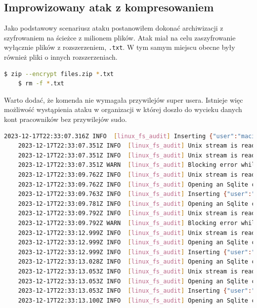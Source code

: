 \subsection{Improwizowany atak z kompresowaniem}
Jako podstawowy scenariusz ataku postanowiłem dokonać archiwizacji z szyfrowaniem na ścieżce z milionem plików. Atak miał na celu zaszyfrowanie wyłącznie plików z rozszerzeniem, \texttt{.txt}. W tym samym miejscu obecne były również pliki o innych rozszerzeniach.
\begin{lstlisting}[language=bash,
    backgroundcolor=\color{EEGold!5!white},
    caption={Komenda użyta do wykonania "ataku".},
    label={lst:commau}]
    $ zip --encrypt files.zip *.txt
    $ rm -f *.txt
\end{lstlisting}
Warto dodać, że komenda nie wymagała przywilejów super usera. Istnieje więc możliwość wystąpienia ataku w organizacji w której doszło do wycieku danych kont pracowników bez przywilejów sudo.
\begin{lstlisting}[language=bash,
    backgroundcolor=\color{EEGold!5!white},
    caption={Fragment logów z części audytowej. Będzie to jedyny tak długi fragment, który
    chciałem pokazać w celach informacyjnych.},
    label={lst:logau}]
    2023-12-17T22:33:07.316Z INFO  [linux_fs_audit] Inserting {"user":"maciek","group":"maciek","executable":"/usr/bin/rm","syscall":"unlinkat","timestamp":"1702852387","key":"WRITE"}
    2023-12-17T22:33:07.351Z INFO  [linux_fs_audit] Unix stream is readable.
    2023-12-17T22:33:07.351Z INFO  [linux_fs_audit] Unix stream is readable.
    2023-12-17T22:33:07.351Z WARN  [linux_fs_audit] Blocking error while reading from socket
    2023-12-17T22:33:09.762Z INFO  [linux_fs_audit] Unix stream is readable.
    2023-12-17T22:33:09.762Z INFO  [linux_fs_audit] Opening an Sqlite connection
    2023-12-17T22:33:09.763Z INFO  [linux_fs_audit] Inserting {"user":"maciek","group":"maciek","executable":"/usr/bin/bash","syscall":"openat","timestamp":"1702852389","key":"READ"}
    2023-12-17T22:33:09.781Z INFO  [linux_fs_audit] Opening an Sqlite connection
    2023-12-17T22:33:09.792Z INFO  [linux_fs_audit] Unix stream is readable.
    2023-12-17T22:33:09.792Z WARN  [linux_fs_audit] Blocking error while reading from socket
    2023-12-17T22:33:12.999Z INFO  [linux_fs_audit] Unix stream is readable
    2023-12-17T22:33:12.999Z INFO  [linux_fs_audit] Opening an Sqlite connection
    2023-12-17T22:33:12.999Z INFO  [linux_fs_audit] Inserting {"user":"maciek","group":"maciek","executable":"/usr/bin/zip","syscall":"openat","timestamp":"1702852392","key":"WRITE"}
    2023-12-17T22:33:13.028Z INFO  [linux_fs_audit] Opening an Sqlite connection
    2023-12-17T22:33:13.053Z INFO  [linux_fs_audit] Unix stream is readable.
    2023-12-17T22:33:13.053Z INFO  [linux_fs_audit] Opening an Sqlite connection
    2023-12-17T22:33:13.053Z INFO  [linux_fs_audit] Inserting {"user":"maciek","group":"maciek","executable":"/usr/bin/zip","syscall":"unlink","timestamp":"1702852393","key":"WRITE"}
    2023-12-17T22:33:13.100Z INFO  [linux_fs_audit] Opening an Sqlite connection
\end{lstlisting}
